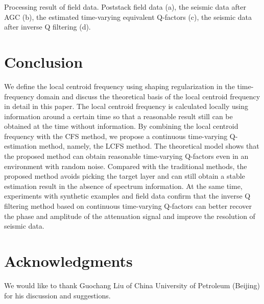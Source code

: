              {Processing result of field data. Poststack field data (a), 
               the seismic data after AGC (b), the estimated time-varying
               equivalent Q-factors (c), the seismic data after inverse Q
               filtering (d).}

\section{Conclusion}
             
We define the local centroid frequency using shaping regularization in
the time-frequency domain and discuss the theoretical basis of the
local centroid frequency in detail in this paper. The local centroid
frequency is calculated locally using information around a certain
time so that a reasonable result still can be obtained at the time
without information. By combining the local centroid frequency with
the CFS method, we propose a continuous time-varying Q-estimation
method, namely, the LCFS method. The theoretical model shows that the
proposed method can obtain reasonable time-varying Q-factors even in
an environment with random noise. Compared with the traditional
methods, the proposed method avoids picking the target layer and can
still obtain a stable estimation result in the absence of spectrum
information. At the same time, experiments with synthetic examples and
field data confirm that the inverse Q filtering method based on
continuous time-varying Q-factors can better recover the phase and
amplitude of the attenuation signal and improve the resolution of
seismic data.

\section{Acknowledgments}

We would like to thank Guochang Liu of China University of Petroleum
(Beijing) for his discussion and suggestions.





